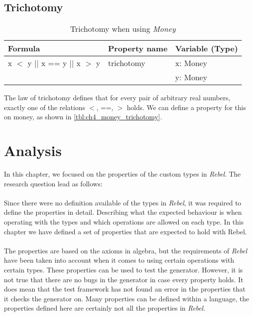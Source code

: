 \subsection*{Trichotomy}
\FloatBarrier
\begin{table}[!ht]
\centering
\begin{tabular}{lll}
\hline
                        \textbf{Formula}             & \textbf{Property name} & \textbf{Variable (Type)} \\ \hline
\rowcolor[HTML]{EFEFEF} x $<$ y $||$ x == y $||$ x $>$ y & trichotomy             & x: Money                 \\
\rowcolor[HTML]{EFEFEF}                              &                        & y: Money                 \\ \hline
\end{tabular}
\caption{Trichotomy when using \textit{Money}}
\label{tbl:ch4_money_trichotomy}
\end{table}
\FloatBarrier
The law of trichotomy defines that for every pair of arbitrary real numbers, exactly one of the relations $<$, ==, $>$ holds. We can define a property for this on money, as shown in \autoref{tbl:ch4_money_trichotomy}.

\section{Analysis}
In this chapter, we focused on the properties of the custom types in \textit{Rebel}. The research question lead as follows:\rqOne\\
\\
Since there were no definition available of the types in \textit{Rebel}, it was required to define the properties in detail. Describing what the expected behaviour is when operating with the types and which operations are allowed on each type. In this chapter we have defined a set of properties that are expected to hold with Rebel.\\
\\
The properties are based on the axioms in algebra, but the requirements of \textit{Rebel} have been taken into account when it comes to using certain operations with certain types. These properties can be used to test the generator. However, it is not true that there are no bugs in the generator in case every property holds. It does mean that the test framework has not found an error in the properties that it checks the generator on. Many properties can be defined within a language, the properties defined here are certainly not all the properties in \textit{Rebel}.

